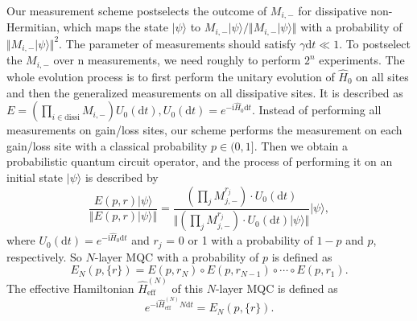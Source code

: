 \documentclass[longbibliography, aps, prx, amsmath, amssymb, amsfonts, twocolumn,superscriptaddress, footinbib]{revtex4-1}
\begin{document}
	Our measurement scheme postselects the outcome of $M_{i,-}$ for dissipative non-Hermitian, which maps the state $\vert \psi \rangle$ to $M_{i,-} \vert \psi \rangle/\Vert M_{i,-} \vert \psi \rangle \Vert$ with a probability of $\Vert M_{i,-} \vert \psi \rangle \Vert^2$. 
	The parameter of measurements should satisfy $\gamma \mathrm{d} t \ll 1$. To postselect the $M_{i,-}$ over n measurements, we need roughly to perform  $2^n$ experiments. 
	The whole evolution process is to first perform the unitary evolution of $\hat{H}_0$ on all sites and then the generalized measurements on all dissipative sites. It is described as $E=(\prod_{i\in \text{dissi}} M_{i,-}) U_{0}(\mathrm{d} t),U_{0}(\mathrm{d}t)=e^{-\mathrm{i}\hat{H}_0 \mathrm{d}t}$.
	Instead of performing all measurements on gain/loss sites, our scheme performs the measurement on each gain/loss site with a classical probability $p\in(0,1]$.
	Then we obtain a probabilistic quantum circuit operator, and the process of performing it on an initial state $\vert \psi \rangle$ is described by
	\begin{equation}
		\frac{E(p,r) \vert \psi \rangle}{\Vert E(p,r) \vert \psi \rangle \Vert} = \frac{(\prod_j M_{j,-}^{r_j}) \cdot U_0(\mathrm{d}t)}{\Vert (\prod_j M_{j,-}^{r_j}) \cdot U_0(\mathrm{d}t) \vert \psi \rangle \Vert} \vert \psi \rangle,
	\end{equation}
	where $U_0(\mathrm{d} t) = e^{-\mathrm{i}\hat{H}_0 \mathrm{d} t}$ and $r_j$ = 0 or 1 with a probability of $1-p$ and $p$, respectively. So $N$-layer MQC with a probability of $p$ is defined as
	\begin{equation}
		E_N(p,\{r\}) = E(p, r_N) \circ E(p, r_{N-1}) \circ \cdots \circ E(p, r_1).
	\end{equation}
	The effective Hamiltonian $\hat{H}_{\text{eff}}^{(N)}$ of this $N$-layer MQC is defined as
	\begin{equation}
		e^{-\mathrm{i}\hat{H}_{\text{eff}}^{(N)} N \mathrm{d} t} = E_N(p,\{r\}). \label{eq:H_scheme1}
	\end{equation}

	
\end{document}
